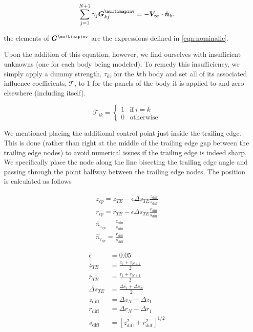 \begin{equation}
    \sum_{j=1}^{N+1} \gamma_j\vect{G}^\multimapinv_{kj} = - \vect{V}_\infty \cdot \hat{\vect{n}}_k.
\end{equation}

\where the elements of \(\vect{G}^\multimapinv\) are the expressions defined in \cref{eqn:nominalic}.

Upon the addition of this equation, however, we find ourselves with insufficient unknowns (one for each body being modeled).
%
To remedy this insufficiency, we simply apply a dummy strength, \(\tau_k\), for the \(k\)th body and set all of its associated influence coefficients, \(\mathcal{T}\), to 1 for the panels of the body it is applied to and zero elsewhere (including itself).

\begin{equation}
    \mathcal{T}_{ik} =
        \begin{cases}
            1 & \text{if}~i=k\\
            0 & \text{otherwise}
        \end{cases}
\end{equation}

We mentioned placing the additional control point just inside the trailing edge.
%
This is done (rather than right at the middle of the trailing edge gap between the trailing edge nodes) to avoid numerical issues if the trailing edge is indeed sharp.
%
We specifically place the node along the line bisecting the trailing edge angle and passing through the point halfway between the trailing edge nodes.
%
The position is calculated as follows

\begin{subequations}
    \begin{align}
        z_{cp} = \overline{z}_{TE} - \epsilon \overline{\Delta s}_{TE} \frac{z_\text{diff}}{s_\text{diff}} \\
        r_{cp} = \overline{r}_{TE} - \epsilon \overline{\Delta s}_{TE} \frac{r_\text{diff}}{s_\text{diff}} \\
        \hat{n}_{z_{cp}} = \frac{z_\text{diff}}{s_\text{diff}} \\
        \hat{n}_{r_{cp}} = \frac{r_\text{diff}}{s_\text{diff}}
    \end{align}
\end{subequations}

\where

\begin{align}
    \epsilon &= 0.05 \\
    \overline{z}_{TE} &= \frac{z_1+z_{N+1}}{2}\\
    \overline{r}_{TE} &= \frac{r_1+r_{N+1}}{2}\\
    \overline{\Delta s}_{TE} &= \frac{\Delta s_1+\Delta s_{N}}{2}\\
    z_\text{diff} &= \Delta z_{N} - \Delta z_{1} \\
    r_\text{diff} &= \Delta r_{N} - \Delta r_{1} \\
    s_\text{diff} &= \left[ z_\text{diff}^2 + r_\text{diff}^2\right]^{1/2}
\end{align}

